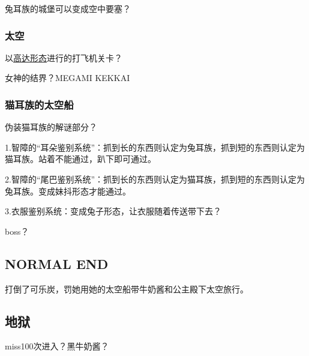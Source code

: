 \documentclass{article}
\begin{document}
兔耳族的城堡可以变成空中要塞？

\subsubsection{太空}
以\hyperref[costume_gundam]{高达形态}进行的打飞机关卡？

女神的结界？MEGAMI KEKKAI

\subsubsection{猫耳族的太空船}

伪装猫耳族的解谜部分？

1.智障的“耳朵鉴别系统”：抓到长的东西则认定为兔耳族，抓到短的东西则认定为猫耳族。站着不能通过，趴下即可通过。

2.智障的“尾巴鉴别系统”：抓到长的东西则认定为猫耳族，抓到短的东西则认定为兔耳族。变成妹抖形态才能通过。

3.衣服鉴别系统：变成兔子形态，让衣服随着传送带下去？

boss？

\subsection{NORMAL END}

打倒了可乐炭，罚她用她的太空船带牛奶酱和公主殿下太空旅行。

\subsection{地狱}

miss100次进入？黑牛奶酱？
\end{document}
